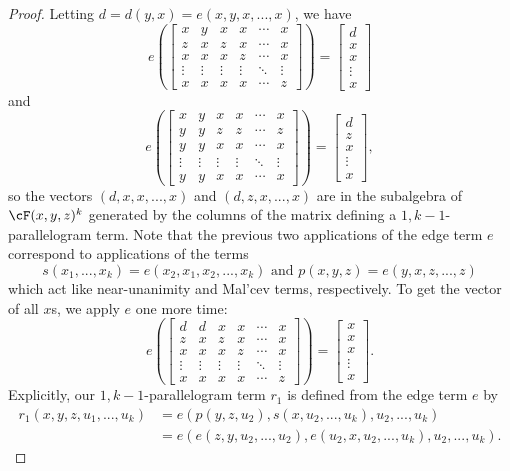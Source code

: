 \begin{proof}
Letting $d = d(y,x) = e(x,y,x,...,x)$, we have
\[
e\left(\begin{bmatrix} x & y & x & x & \cdots & x\\ z & x & z & x & \cdots & x\\ x & x & x & z & \cdots & x\\ \vdots & \vdots & \vdots & \vdots & \ddots & \vdots\\ x & x & x & x & \cdots & z \end{bmatrix}\right) = \begin{bmatrix} d\\ x\\ x\\ \vdots \\ x \end{bmatrix}
\]
and
\[
e\left(\begin{bmatrix} x & y & x & x & \cdots & x\\ y & y & z & z & \cdots & z\\ y & y & x & x & \cdots & x\\ \vdots & \vdots & \vdots & \vdots & \ddots & \vdots\\ y & y & x & x & \cdots & x \end{bmatrix}\right) = \begin{bmatrix} d\\ z\\ x\\ \vdots \\ x \end{bmatrix},
\]
so the vectors $(d,x,x,...,x)$ and $(d,z,x,...,x)$ are in the subalgebra of $\cF(x,y,z)^k$ generated by the columns of the matrix defining a $1,k-1$-parallelogram term. Note that the previous two applications of the edge term $e$ correspond to applications of the terms
\[
s(x_1, ..., x_k) = e(x_2, x_1, x_2, ..., x_k) \text{ and } p(x,y,z) = e(y,x,z,...,z)
\]
which act like near-unanimity and Mal'cev terms, respectively. To get the vector of all $x$s, we apply $e$ one more time:
\[
e\left(\begin{bmatrix} d & d & x & x & \cdots & x\\ z & x & z & x & \cdots & x\\ x & x & x & z & \cdots & x\\ \vdots & \vdots & \vdots & \vdots & \ddots & \vdots\\ x & x & x & x & \cdots & z \end{bmatrix}\right) = \begin{bmatrix} x\\ x\\ x\\ \vdots \\ x \end{bmatrix}.
\]
Explicitly, our $1,k-1$-parallelogram term $r_1$ is defined from the edge term $e$ by
\begin{align*}
r_1(x,y,z,u_1,...,u_k) &= e(p(y,z,u_2),s(x,u_2,...,u_k),u_2,...,u_k)\\
&= e(e(z,y,u_2,...,u_2),e(u_2,x,u_2,...,u_k),u_2,...,u_k).
\end{align*}


\end{proof}
